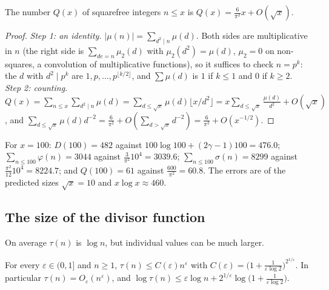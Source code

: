 \begin{proposition}\label{analytic-number-theory:proposition-squarefree}
The number $Q(x)$ of squarefree integers $n \leq x$ is $Q(x) = \frac{6}{\pi^2}x + O(\sqrt{x})$.
\end{proposition}

\begin{proof}
\emph{Step 1: an identity.} $|\mu(n)| = \sum_{d^2 \mid n}\mu(d)$. Both sides are multiplicative in $n$ (the right side is $\sum_{de = n}\mu_2(d)$ with $\mu_2(d^2) = \mu(d)$, $\mu_2 = 0$ on
non-squares, a convolution of multiplicative functions), so it suffices to check $n = p^k$: the $d$ with $d^2 \mid p^k$ are $1, p, \ldots, p^{\lfloor k/2\rfloor}$, and $\sum\mu(d)$ is $1$ if $k \leq 1$ and $0$
if $k \geq 2$.
\emph{Step 2: counting.} $Q(x) = \sum_{n \leq x}\sum_{d^2 \mid n}\mu(d) = \sum_{d \leq \sqrt{x}}\mu(d)\lfloor x/d^2\rfloor = x\sum_{d \leq \sqrt{x}}\frac{\mu(d)}{d^2} + O(\sqrt{x})$, and
$\sum_{d \leq \sqrt{x}}\mu(d)d^{-2} = \frac{6}{\pi^2} + O(\sum_{d > \sqrt{x}}d^{-2}) = \frac{6}{\pi^2} + O(x^{-1/2})$.
\end{proof}

\begin{example}\label{analytic-number-theory:example-averages}
For $x = 100$: $D(100) = 482$ against $100\log 100 + (2\gamma - 1)100 = 476.0$; $\sum_{n \leq 100}\varphi(n) = 3044$ against $\frac{3}{\pi^2}10^4 = 3039.6$; $\sum_{n \leq 100}\sigma(n) = 8299$
against $\frac{\pi^2}{12}10^4 = 8224.7$; and $Q(100) = 61$ against $\frac{600}{\pi^2} = 60.8$. The errors are of the predicted sizes $\sqrt{x} = 10$ and $x\log x \approx 460$.
\end{example}

\subsection{The size of the divisor function}\label{analytic-number-theory:subsection-divisor-size}

On average $\tau(n)$ is $\log n$, but individual values can be much larger.

\begin{proposition}\label{analytic-number-theory:proposition-divisor-bound}
For every $\varepsilon \in (0, 1]$ and $n \geq 1$, $\tau(n) \leq C(\varepsilon)n^\varepsilon$ with $C(\varepsilon) = \bigl(1 + \frac{1}{\varepsilon\log 2}\bigr)^{2^{1/\varepsilon}}$. In particular
$\tau(n) = O_\varepsilon(n^\varepsilon)$, and $\log\tau(n) \leq \varepsilon\log n + 2^{1/\varepsilon}\log\bigl(1 + \frac{1}{\varepsilon\log 2}\bigr)$.
\end{proposition}


